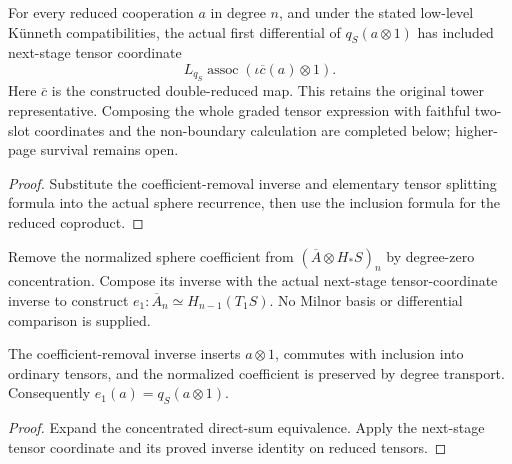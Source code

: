 \begin{proposition}
  \label{prop:h6-actual-first-differential-reduced-coproduct}
  \leanok
  For every reduced cooperation $a$ in degree $n$, and under the stated
  low-level K\"unneth compatibilities, the actual first differential
  of $q_S(a\otimes1)$ has included next-stage tensor coordinate
  \[
    L_{q_S}\operatorname{assoc}(\iota\overline c(a)\otimes1).
  \]
  Here $\overline c$ is the constructed double-reduced map. This retains
  the original tower representative. Composing the whole graded tensor
  expression with faithful two-slot coordinates and the non-boundary
  calculation are completed below; higher-page survival remains open.
\end{proposition}
\begin{proof}
  Substitute the coefficient-removal inverse and elementary tensor
  splitting formula into the actual sphere recurrence, then use the
  inclusion formula for the reduced coproduct.
  \leanok
\end{proof}

\begin{definition}
  \label{def:h6-reduced-sphere-boundary-equiv}
  \leanok
  Remove the normalized sphere coefficient from
  $(\overline A\otimes H_*S)_n$ by degree-zero concentration.
  Compose its inverse with the actual next-stage tensor-coordinate inverse
  to construct $e_1:\overline A_n\simeq H_{n-1}(T_1S)$.
  No Milnor basis or differential comparison is supplied.
\end{definition}

\begin{proposition}
  \label{prop:h6-reduced-sphere-boundary-equiv}
  \leanok
  The coefficient-removal inverse inserts $a\otimes1$, commutes with
  inclusion into ordinary tensors, and the normalized coefficient is
  preserved by degree transport. Consequently $e_1(a)=q_S(a\otimes1)$.
\end{proposition}
\begin{proof}
  Expand the concentrated direct-sum equivalence. Apply the next-stage
  tensor coordinate and its proved inverse identity on reduced tensors.
  \leanok
\end{proof}

